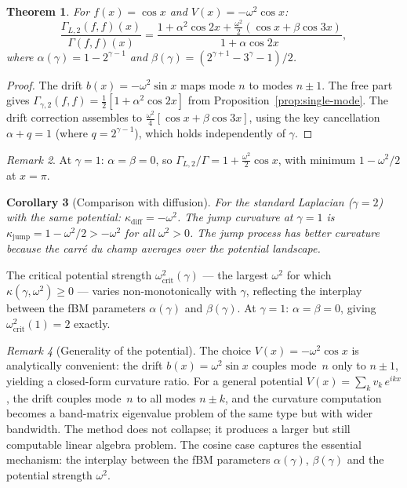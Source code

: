 \documentclass[11pt,a4paper]{article}
\theoremstyle{plain}
\newtheorem{theorem}{Theorem}[section]
\newtheorem{corollary}[theorem]{Corollary}
\theoremstyle{definition}
\theoremstyle{remark}
\newtheorem{remark}[theorem]{Remark}
\begin{document}
\begin{theorem}\label{thm:potential}
For $f(x) = \cos x$ and $V(x) = -\omega^2\cos x$:
\begin{equation}\label{eq:G2-ratio-potential}
  \frac{\Gamma_{L,2}(f,f)(x)}{\Gamma(f,f)(x)}
  = \frac{1 + \alpha^2\cos 2x + \tfrac{\omega^2}{2}(\cos x + \beta\cos 3x)}
         {1 + \alpha\cos 2x},
\end{equation}
where
$\alpha(\gamma) = 1 - 2^{\gamma-1}$ and
$\beta(\gamma) = (2^{\gamma+1} - 3^\gamma - 1)/2$.
\end{theorem}

\begin{proof}
The drift $b(x) = -\omega^2\sin x$ maps mode $n$ to modes $n \pm 1$.
The free part gives
$\Gamma_{\gamma,2}(f,f) = \frac{1}{2}[1 + \alpha^2\cos 2x]$
from Proposition~\ref{prop:single-mode}.
The drift correction assembles to
$\frac{\omega^2}{4}[\cos x + \beta\cos 3x]$,
using the key cancellation $\alpha + q = 1$ (where $q = 2^{\gamma-1}$),
which holds independently of $\gamma$.
\end{proof}

\begin{remark}
At $\gamma = 1$: $\alpha = \beta = 0$, so
$\Gamma_{L,2}/\Gamma = 1 + \frac{\omega^2}{2}\cos x$,
with minimum $1 - \omega^2/2$ at $x = \pi$.
\end{remark}

\begin{corollary}[Comparison with diffusion]\label{cor:comparison}
For the standard Laplacian ($\gamma = 2$) with the same potential:
$\kappa_{\mathrm{diff}} = -\omega^2$.
The jump curvature at $\gamma = 1$ is
$\kappa_{\mathrm{jump}} = 1 - \omega^2/2 > -\omega^2$
for all $\omega^2 > 0$. The jump process has better curvature because
the carr\'e du champ averages over the potential landscape.
\end{corollary}

The critical potential strength $\omega^2_{\mathrm{crit}}(\gamma)$
--- the largest $\omega^2$ for which $\kappa(\gamma,\omega^2) \geq 0$
--- varies non-monotonically with $\gamma$, reflecting the interplay
between the fBM parameters $\alpha(\gamma)$ and $\beta(\gamma)$.
At $\gamma = 1$: $\alpha = \beta = 0$, giving
$\omega^2_{\mathrm{crit}}(1) = 2$ exactly.

\begin{remark}[Generality of the potential]\label{rem:potential-general}
The choice $V(x) = -\omega^2\cos x$ is analytically convenient:
the drift $b(x) = \omega^2\sin x$ couples mode~$n$ only to
$n \pm 1$, yielding a closed-form curvature ratio.
For a general potential $V(x) = \sum_k v_k\,e^{ikx}$, the drift
couples mode~$n$ to all modes $n \pm k$, and the curvature
computation becomes a band-matrix eigenvalue problem of the same
type but with wider bandwidth. The method does not collapse;
it produces a larger but still computable linear algebra problem.
The cosine case captures the essential mechanism: the interplay
between the fBM parameters $\alpha(\gamma)$, $\beta(\gamma)$ and
the potential strength $\omega^2$.
\end{remark}
\end{document}
